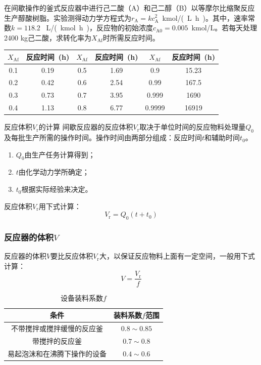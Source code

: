 \documentclass[dvipsnames, svgnames, x11names]{beamer}
\begin{document}
\begin{frame}[t]
    \frametitle{}
    \begin{question}
        在间歇操作的釜式反应器中进行己二酸（A）和己二醇（B）以等摩尔比缩聚反应生产醇酸树脂。实验测得动力学方程式为$r_\mathrm{A} = kc_\mathrm{A}^2$\ \si{kmol/(L.h)}。其中，速率常数$k = 118.2$ \ \si{L/(kmol.h)}，反应物的初始浓度$c_\mathrm{A0} = 0.005$\ \si{kmol/L}。若每天处理2400 kg己二酸，求转化率为$X_\mathrm{Af}$时所需反应时间。
        \begin{table}
            \centering
            \begin{tabular}{cc||cc||cc}
                \bottomrule
                $X_\mathrm{Af}$ & 反应时间\ (h) & $X_\mathrm{Af}$ & 反应时间\ (h) & $X_\mathrm{Af}$ & 反应时间\ (h) \\ \hline
                0.1 & 0.19 & 0.5 & 1.69 & 0.9 & 15.23 \\ 
                0.2 & 0.42 & 0.6 & 2.54 & 0.99 & 167.5 \\ 
                0.3 & 0.73 & 0.7 & 3.95 & 0.999 & 1690 \\ 
                0.4 & 1.13 & 0.8 & 6.77 & 0.9999 & 16919 \\ \toprule
            \end{tabular}
        \end{table}
    \end{question}
\end{frame}


\begin{frame}{反应体积$V_\mathrm{r}$的计算}      
    间歇反应器的反应体积$V_\mathrm{r}$取决于单位时间的反应物料处理量$Q_0$及每批生产所需的操作时间。操作时间由两部分组成：反应时间$t$和辅助时间$t_0$。
    \begin{enumerate}
      \item $Q_0$由生产任务计算得到；
      \item $t$由化学动力学所确定；
      \item $t_0$根据实际经验来决定。
    \end{enumerate}
    反应体积$V_\mathrm{r}$用下式计算：
    \[
        V_\mathrm{r}=Q_0(t+t_0)
    \]
\end{frame}


\begin{frame}
    \frametitle{反应器的体积$V$}
    反应器的体积$V$要比反应体积$V_\mathrm{r}$大，以保证反应物料上面有一定空间，一般用下式计算：
    \[
        V=\frac{V_\mathrm{r}}{f}
    \]
    \begin{table}
        \centering
        \caption{设备装料系数$f$}
        \begin{tabular}{cc}
            \bottomrule
            条件 & \qquad 装料系数$f$范围\qquad  \\ \hline
            不带搅拌或搅拌缓慢的反应釜 & $0.8\sim 0.85$ \\ 
            带搅拌的反应釜 & $0.7\sim 0.8$ \\ 
            易起泡沫和在沸腾下操作的设备 & $0.4\sim 0.6$ \\ \toprule
        \end{tabular}
    \end{table}
\end{frame}
\end{document}
